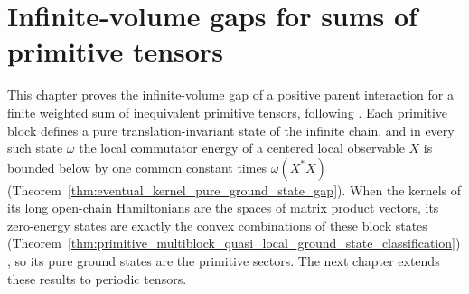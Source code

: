 \chapter{Infinite-volume gaps for sums of primitive tensors}
\label{ch:parent_hamiltonian_long_range_gaps_primitive_sectors}

This chapter proves the infinite-volume gap of a positive parent interaction
for a finite weighted sum of inequivalent primitive tensors, following
\cite[Theorems~1.1--1.2]{Nachtergaele1996Spectral}. Each primitive block
defines a pure translation-invariant state of the infinite chain, and in every
such state $\omega$ the local commutator energy of a centered local observable
$X$ is bounded below by one common constant times $\omega(X^*X)$
(Theorem~\ref{thm:eventual_kernel_pure_ground_state_gap}). When the
kernels of its long open-chain Hamiltonians are the spaces of matrix product
vectors, its zero-energy states are exactly the convex combinations of these
block states
(Theorem~\ref{thm:primitive_multiblock_quasi_local_ground_state_classification}),
so its pure ground states are the primitive sectors.
The next chapter extends these results to periodic tensors.


